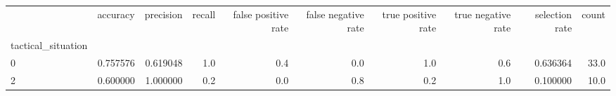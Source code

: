 \begin{tabular}{lrrrrrrrrr}
\toprule
{} &  accuracy &  precision &  recall &  false positive rate &  false negative rate &  true positive rate &  true negative rate &  selection rate &  count \\
tactical\_situation &           &            &         &                      &                      &                     &                     &                 &        \\
\midrule
0                  &  0.757576 &   0.619048 &     1.0 &                  0.4 &                  0.0 &                 1.0 &                 0.6 &        0.636364 &   33.0 \\
2                  &  0.600000 &   1.000000 &     0.2 &                  0.0 &                  0.8 &                 0.2 &                 1.0 &        0.100000 &   10.0 \\
\bottomrule
\end{tabular}

